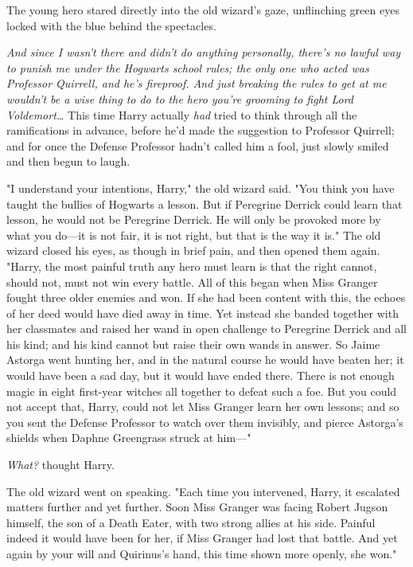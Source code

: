 The young hero stared directly into the old wizard's gaze, unflinching green
eyes locked with the blue behind the spectacles.

\emph{And since I wasn't there and didn't do anything personally, there's no
lawful way to punish me under the Hogwarts school rules; the only one who acted
was Professor Quirrell, and he's fireproof. And just breaking the rules to get
at me wouldn't be a wise thing to do to the hero you're grooming to fight Lord
Voldemort{\ldots}} This time Harry actually \emph{had} tried to think through
all the ramifications in advance, before he'd made the suggestion to Professor
Quirrell; and for once the Defense Professor hadn't called him a fool, just
slowly smiled and then begun to laugh.

"I understand your intentions, Harry," the old wizard said. "You think you have
taught the bullies of Hogwarts a lesson. But if Peregrine Derrick could learn
that lesson, he would not be Peregrine Derrick. He will only be provoked more
by what you do---it is not fair, it is not right, but that is the way it is."
The old wizard closed his eyes, as though in brief pain, and then opened them
again. "Harry, the most painful truth any hero must learn is that the right
cannot, should not, must not win every battle. All of this began when Miss
Granger fought three older enemies and won. If she had been content with this,
the echoes of her deed would have died away in time. Yet instead she banded
together with her classmates and raised her wand in open challenge to Peregrine
Derrick and all his kind; and his kind cannot but raise their own wands in
answer. So Jaime Astorga went hunting her, and in the natural course he would
have beaten her; it would have been a sad day, but it would have ended there.
There is not enough magic in eight first-year witches all together to defeat
such a foe. But you could not accept that, Harry, could not let Miss Granger
learn her own lessons; and so you sent the Defense Professor to watch over them
invisibly, and pierce Astorga's shields when Daphne Greengrass struck at him---"

\emph{What?} thought Harry.

The old wizard went on speaking. "Each time you intervened, Harry, it escalated
matters further and yet further. Soon Miss Granger was facing Robert Jugson
himself, the son of a Death Eater, with two strong allies at his side. Painful
indeed it would have been for her, if Miss Granger had lost that battle. And
yet again by your will and Quirinus's hand, this time shown more openly, she
won."


